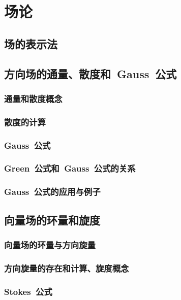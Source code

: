 

\chapter{场\emspace 论}\label{ch:23}
\section{场的表示法}
\section{方向场的通量、散度和~Gauss~公式}
\subsection{通量和散度概念}
\subsection{散度的计算}
\subsection{Gauss~公式}
\subsection{Green~公式和~Gauss~公式的关系}
\subsection{Gauss~公式的应用与例子}
\begin{exercise}
\item
\end{exercise}
\section{向量场的环量和旋度}
\subsection{向量场的环量与方向旋量}
\subsection{方向旋量的存在和计算、旋度概念}
\subsection{Stokes~公式}
\begin{exercise}
\item
\end{exercise}
